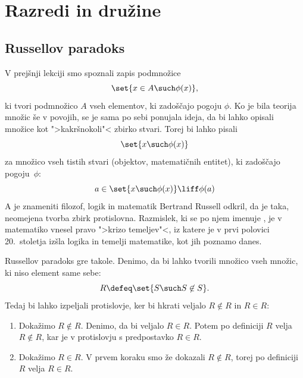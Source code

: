 \chapter{Razredi in družine}
\label{cha:razred-druzine}

\section{Russellov paradoks}

V prejšnji lekciji smo spoznali zapis podmnožice
%
\begin{equation*}
    \set{ x \in A \such \phi(x) },
\end{equation*}
%
ki tvori podmnožico $A$ vseh elementov, ki zadoščajo pogoju $\phi$. Ko je bila
teorija množic še v povojih, se je sama po sebi ponujala ideja, da bi lahko
opisali množice kot ">kakršnokoli"< zbirko stvari. Torej bi lahko pisali
%
\begin{equation*}
    \set{ x \such \phi(x) }
\end{equation*}
%
za množico vseh tistih stvari (objektov, matematičnih entitet), ki zadoščajo
pogoju~$\phi$:
%
\begin{equation*}
    a \in \set{ x \such \phi(x) } \liff \phi(a)
\end{equation*}
%
A je znameniti filozof, logik in matematik Bertrand Russell odkril, 
da je taka, neomejena tvorba zbirk protislovna.
%
Razmislek, ki se po njem imenuje , je v matematiko vnesel pravo ">krizo
temeljev"<, iz katere je v prvi polovici 20.~stoletja izšla logika in
temelji matematike, kot jih poznamo danes.

Russellov paradoks gre takole. Denimo, da bi lahko tvorili množico vseh množic, ki niso element same
sebe:
%
\begin{equation*}
    R \defeq \set{ S \such S \not\in S }.
\end{equation*}
%
Tedaj bi lahko izpeljali protislovje, ker bi hkrati veljalo $R \not\in R$ in $R \in R$:
%
\begin{enumerate}
\item Dokažimo $R \not\in R$.
  Denimo, da bi veljalo $R \in R$. Potem po definiciji $R$ velja $R \not\in R$, kar
  je v protislovju s predpostavko $R \in R$.

\item
  Dokažimo $R \in R$. V prvem koraku smo že dokazali $R \not\in R$, torej po
  definiciji $R$ velja $R \in R$.
\end{enumerate}


